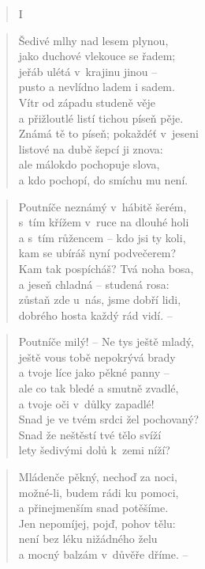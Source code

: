 \begin{verse}
I~\end{verse}

\begin{verse}
Šedivé mlhy nad lesem plynou, \\
jako duchové vlekouce se řadem; \\
jeřáb ulétá v~krajinu jinou -- \\
pusto a nevlídno ladem i sadem. \\
Vítr od západu studeně věje \\
a přižloutlé listí tichou píseň pěje. \\
Známá tě to píseň; pokaždéť v~jeseni \\
listové na dubě šepcí ji znova: \\
ale málokdo pochopuje slova, \\
a kdo pochopí, do smíchu mu není.
\end{verse}

\begin{verse}
Poutníče neznámý v~hábitě šerém, \\
s~tím křížem v~ruce na dlouhé holi \\
a s~tím růžencem -- kdo jsi ty koli, \\
kam se ubíráš nyní podvečerem? \\
Kam tak pospícháš? Tvá noha bosa, \\
a jeseň chladná -- studená rosa: \\
zůstaň zde u~nás, jsme dobří lidi, \\
dobrého hosta každý rád vidí. --
\end{verse}

\begin{verse}
Poutníče milý! -- Ne tys ještě mladý, \\
ještě vous tobě nepokrývá brady \\
a tvoje líce jako pěkné panny -- \\
ale co tak bledé a smutně zvadlé, \\
a tvoje oči v~důlky zapadlé! \\
Snad je ve tvém srdci žel pochovaný? \\
Snad že neštěstí tvé tělo svíží \\
lety šedivými dolů k~zemi níží?
\end{verse}

\begin{verse}
Mládenče pěkný, nechoď za noci, \\
možné-li, budem rádi ku pomoci, \\
a přinejmenším snad potěšíme. \\
Jen nepomíjej, pojď, pohov tělu: \\
není bez léku nižádného želu \\
a mocný balzám v~důvěře dříme. --
\end{verse}

